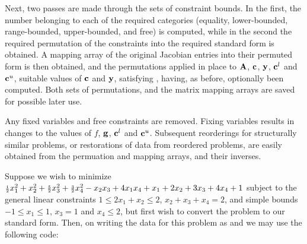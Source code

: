 \documentclass{galahad}
\begin{document}
Next, two passes are made through the sets of constraint bounds. 
In the first, the number belonging to each of the required categories 
(equality, lower-bounded, range-bounded, 
upper-bounded, and free) is computed, while in the 
second the required permutation of the constraints 
into the required standard form is obtained. 
A mapping array of the original Jacobian entries into their 
permuted form is then obtained, and the permutations applied in place 
to ${\mathbf{A}}$, ${\mathbf{c}}$, ${\mathbf{y}}$, ${\mathbf{c}}^l$ and ${\mathbf{c}}^u$, 
suitable values of ${\mathbf{c}}$ and ${\mathbf{y}}$, satisfying ,
having, as before, optionally been computed. 
Both sets of permutations, and the matrix mapping arrays are saved for 
possible later use. 
 
Any fixed variables and free constraints are removed. Fixing variables 
results in changes to the values of $f$, ${\mathbf{g}}$, ${\mathbf{c}}^l$ and ${\mathbf{c}}^u$. 
Subsequent reorderings for structurally similar problems, or restorations 
of data from reordered problems, 
are easily obtained from the permuation and mapping arrays, and their inverses. 


\galexample
Suppose we wish to minimize
${\scriptstyle \frac{1}{2}} x_1^2 + x_2^2 + {\scriptstyle \frac{5}{2}} x_3^2 + 
{\scriptstyle \frac{3}{2}} x_4^2 - x_2 x_3 + 4 x_1 x_4 
 + x_1 + 2 x_2 + 3 x_3 + 4 x_4 + 1$ 
subject to the general linear constraints 
$1 \leq 2 x_1 + x_2 \leq 2$, 
$x_2 + x_3 + x_4 = 2$, and simple bounds 
$-1 \leq x_1 \leq 1$, $x_3 = 1$ and $x_4 \leq 2$, but first wish to 
convert the problem to our standard form. 
Then, on writing the data for this problem as 
and
we may use the following code:
\end{document}
